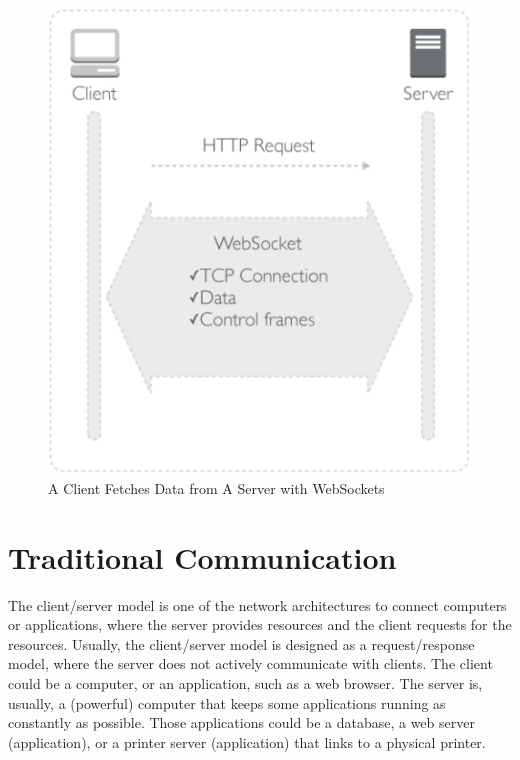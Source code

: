 \begin{figure}[ht]
  \begin{center}
    \includegraphics[width=1\textwidth]{images/client-server-ws.pdf}
    \caption{A Client Fetches Data from A Server with WebSockets}
    \label{fig:client-server-ws}
  \end{center}
\end{figure}

\section{Traditional Communication}

The client/server model is one of the network architectures to connect computers or applications, where the server provides resources and the client requests for the resources. Usually, the client/server model is designed as a request/response model, where the server does not actively communicate with clients. The client could be a computer, or an application, such as a web browser. The server is, usually, a (powerful) computer that keeps some applications running as constantly as possible. Those applications could be a database, a web server (application), or a printer server (application) that links to a physical printer. 

